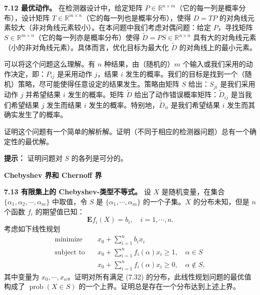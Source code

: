 \documentclass[UTF8, 12pt, fontset=fandol, oneside]{ctexart}
\begin{document}
\noindent\textbf{7.12 最优动作。}\quad
在检测器设计中，给定矩阵 $P\in\mathbb{R}^{n\times m}$（它的每一列是概率分布），设计矩阵 $T\in\mathbb{R}^{m\times n}$（它的每一列也是概率分布），使得 $D=TP$ 的对角线元素较大（非对角线元素较小）。在本问题中我们考虑对偶问题：给定 $P$，寻找矩阵 $S\in\mathbb{R}^{m\times n}$（它的每一列亦是概率分布）使得 $\tilde{D}=PS\in\mathbb{R}^{n\times n}$ 具有大的对角线元素（小的非对角线元素）。具体而言，优化目标为最大化 $\tilde{D}$ 的对角线上的最小元素。

可以将这个问题这么理解。有 $n$ 种结果，由（随机的）$m$ 个输入或我们采用的动作决定，即：$P_{ij}$ 是采用动作 $j$，结果 $i$ 发生的概率。我们的目标是找到一个（随机）策略，尽可能使得任意设定的结果发生。策略由矩阵 $S$ 给出：$S_{ji}$ 是我们采用动作 $j$ 并希望结果 $i$ 发生的概率。矩阵 $\tilde{D}$ 给出了动作错误概率矩阵：$\tilde{D}_{ij}$ 是当我们希望结果 $j$ 发生而结果 $i$ 发生的概率。特别地，$\tilde{D}_{ii}$ 是我们希望结果 $i$ 发生而其确实发生了的概率。

证明这个问题有一个简单的解析解。证明（不同于相应的检测器问题）总有一个确定性的最优解。

\noindent\textbf{提示：}\quad
证明问题对 $S$ 的各列是可分的。

\noindent\textbf{Chebyshev 界和 Chernoff 界}

\noindent\textbf{7.13 有限集上的 Chebyshev-类型不等式。}\quad
设 $X$ 是随机变量，在集合 $\{\alpha_1,\alpha_2,\cdots,\alpha_m\}$ 中取值，令 $S$ 是 $\{\alpha_1,\cdots,\alpha_m\}$ 的一个子集。$X$ 的分布未知，但是 $n$ 个函数 $f_i$ 的期望值已知：
\begin{equation}
\mathbf{E}f_i(X)=b_i,\quad i=1,\cdots,n.
\tag{7.32}
\end{equation}
考虑如下线性规划
\[
\begin{aligned}
\text{minimize}\quad & x_0+\sum_{i=1}^n b_ix_i\\
\text{subject to}\quad & x_0+\sum_{i=1}^n f_i(\alpha)x_i\geq 1,\quad \alpha\in S\\
& x_0+\sum_{i=1}^n f_i(\alpha)x_i\geq 0,\quad \alpha\notin S,
\end{aligned}
\]
其中变量为 $x_0,\cdots,x_n$。证明对所有满足 (7.32) 的分布，此线性规划问题的最优值构成了 $\operatorname{prob}(X\in S)$ 的一个上界。证明总是存在一个分布达到上述上界。
\end{document}
